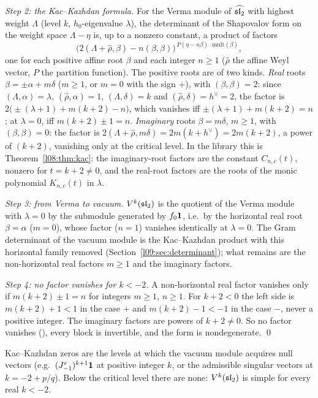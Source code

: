 \emph{Step 2: the Kac--Kazhdan formula.} For the Verma module of $\widehat{\mathfrak{sl}_2}$ with highest weight $\Lambda$ (level
$k$, $h_0$-eigenvalue $\lambda$), the determinant of the Shapovalov form on the weight space
$\Lambda-\eta$ is, up to a nonzero constant, a product of factors
\begin{equation*}
  \bigl(2(\Lambda+\hat\rho,\beta)-n(\beta,\beta)\bigr)^{\,P(\eta-n\beta)\cdot\mathrm{mult}(\beta)},
\end{equation*}
one for each positive affine root $\beta$ and each integer $n\ge1$ ($\hat\rho$ the affine Weyl vector, $P$ the partition
function). The positive roots are of two kinds. \emph{Real} roots $\beta = \pm\alpha+m\delta$ ($m\ge1$, or $m = 0$ with the
sign $+$), with $(\beta,\beta) = 2$: since $(\Lambda,\alpha) = \lambda$, $(\hat\rho,\alpha) = 1$, $(\Lambda,\delta) = k$ and
$(\hat\rho,\delta) = h^\vee = 2$, the factor is $2\bigl(\pm(\lambda+1)+m(k+2)-n\bigr)$, which vanishes iff
$\pm(\lambda+1)+m(k+2) = n$; at $\lambda = 0$, iff $m(k+2)\pm1 = n$. \emph{Imaginary} roots $\beta = m\delta$, $m\ge1$, with $(\beta,\beta) = 0$: the
factor is $2(\Lambda+\hat\rho,m\delta) = 2m(k+h^\vee) = 2m(k+2)$, a power of $(k+2)$, vanishing only at the critical level.
In the library this is Theorem~\ref{l08:thm:kac}: the imaginary-root factors are the constant $C_{n,c}(t)$, nonzero for
$t = k+2\ne0$, and the real-root factors are the roots of the monic polynomial $K_{n,c}(t)$ in $\lambda$.

\emph{Step 3: from Verma to vacuum.} $V^k(\mathfrak{sl}_2)$ is the quotient of the Verma module with $\lambda = 0$ by the submodule
generated by $f_0\mathbf{1}$, i.e.\ by the horizontal real root $\beta = \alpha$ ($m = 0$), whose factor ($n = 1$) vanishes
identically at $\lambda = 0$. The Gram determinant of the vacuum module is the Kac--Kazhdan product with this horizontal family
removed (Section~\ref{l09:sec:determinant}); what remains are the non-horizontal real factors $m\ge1$ and the imaginary
factors.

\emph{Step 4: no factor vanishes for $k<-2$.} A non-horizontal real factor vanishes only if $m(k+2)\pm1 = n$ for integers
$m\ge1$, $n\ge1$. For $k+2<0$ the left side is $m(k+2)+1<1$ in the case $+$ and $m(k+2)-1<-1$ in the case $-$, never a
positive integer. The imaginary factors are powers of $k+2\ne0$. So no factor vanishes
(), every block is invertible, and the form is nondegenerate. \qed

\begin{physics}
Kac--Kazhdan zeros are the levels at which the vacuum module acquires null vectors (e.g.\ $(J^e_{-1})^{k+1}\mathbf{1}$ at
positive integer $k$, or the admissible singular vectors at $k = -2+p/q$). Below the critical level there are none:
$V^k(\mathfrak{sl}_2)$ is simple for every real $k<-2$.
\end{physics}

